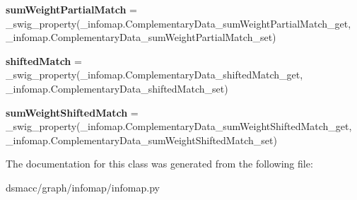 \begin{DoxyCompactItemize}
\item 
\mbox{\label{classdsmacc_1_1graph_1_1infomap_1_1infomap_1_1ComplementaryData_ad2c29d728b80574afb91a625eb82790d}} 
{\bfseries sum\+Weight\+Partial\+Match} = \+\_\+swig\+\_\+property(\+\_\+infomap.\+Complementary\+Data\+\_\+sum\+Weight\+Partial\+Match\+\_\+get, \+\_\+infomap.\+Complementary\+Data\+\_\+sum\+Weight\+Partial\+Match\+\_\+set)
\item 
\mbox{\label{classdsmacc_1_1graph_1_1infomap_1_1infomap_1_1ComplementaryData_aa23a00ea326dd5ff5d58657741afe826}} 
{\bfseries shifted\+Match} = \+\_\+swig\+\_\+property(\+\_\+infomap.\+Complementary\+Data\+\_\+shifted\+Match\+\_\+get, \+\_\+infomap.\+Complementary\+Data\+\_\+shifted\+Match\+\_\+set)
\item 
\mbox{\label{classdsmacc_1_1graph_1_1infomap_1_1infomap_1_1ComplementaryData_a2c0ad8008086a84b512367f1fbe822bb}} 
{\bfseries sum\+Weight\+Shifted\+Match} = \+\_\+swig\+\_\+property(\+\_\+infomap.\+Complementary\+Data\+\_\+sum\+Weight\+Shifted\+Match\+\_\+get, \+\_\+infomap.\+Complementary\+Data\+\_\+sum\+Weight\+Shifted\+Match\+\_\+set)
\end{DoxyCompactItemize}


The documentation for this class was generated from the following file\+:\begin{DoxyCompactItemize}
\item 
dsmacc/graph/infomap/infomap.\+py\end{DoxyCompactItemize}
